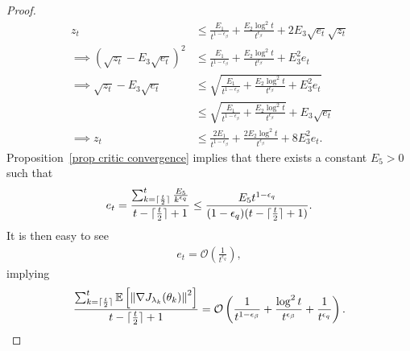 \documentclass[twoside,11pt]{article}
\DeclarePairedDelimiter{\ceil}{\lceil}{\rceil}
\newcommand{\fO}{\mathcal{O}}
\newcommand{\E}{\mathbb{E}}
\numberwithin{assucounter}{section}
\begin{document}
\begin{proof}
\begin{align}
  z_t &\leq \frac{E_1}{t^{1 - \epsilon_\beta}} + \frac{E_2 \log^2 t}{t^{\epsilon_\beta}} + 2E_3 \sqrt{e_t}\sqrt{z_t} \\
  \implies \left(\sqrt{z_t} - E_3 \sqrt{e_t} \right)^2 &\leq \frac{E_1}{t^{1 - \epsilon_\beta}} + \frac{E_2 \log^2 t}{t^{\epsilon_\beta}} + E_3^2 e_t \\
  \implies \sqrt{z_t} - E_3 \sqrt{e_t} &\leq \sqrt{\frac{E_1}{t^{1 - \epsilon_\beta}} + \frac{E_2 \log^2 t}{t^{\epsilon_\beta}} + E_3^2 e_t} \\
  &\leq \sqrt{\frac{E_1}{t^{1 - \epsilon_\beta}} + \frac{E_2 \log^2 t}{t^{\epsilon_\beta}}}  + E_3 \sqrt{e_t} \\ 
  \implies z_t &\leq \frac{2E_1}{t^{1 - \epsilon_\beta}} + \frac{2E_2 \log^2 t}{t^{\epsilon_\beta}} + 8E_3^2 e_t.
\end{align} 
Proposition~\ref{prop critic convergence} implies that there exists a constant $E_5 > 0$ such that 
\begin{align}
  e_t = \frac{\sum_{k=\ceil{\frac{t}{2}}}^t \frac{E_5}{k^{\epsilon_q}}}{t-\ceil{\frac{t}{2}}+1} \leq \frac{E_5 t^{1-\epsilon_q} }{(1 - \epsilon_q) (t - \ceil{\frac{t}{2}} +1)}.
\end{align}
It is then easy to see
\begin{align}
  e_t = \fO\left(\frac{1}{t^{\epsilon_q}}\right),
\end{align}
implying
\begin{align}
  \label{eq actor convergence stationary points}
  \frac{\sum_{k=\ceil{\frac{t}{2}}}^t \E\left[\norm{ \nabla J_{\lambda_k}(\theta_k)}^2\right] }{t-\ceil{\frac{t}{2}}+1} = \fO\left(\frac{1}{t^{1-\epsilon_\beta}} + \frac{\log^2t}{t^{\epsilon_\beta}} + \frac{1}{t^{\epsilon_q}}\right).
\end{align}

\end{proof}
\end{document}
